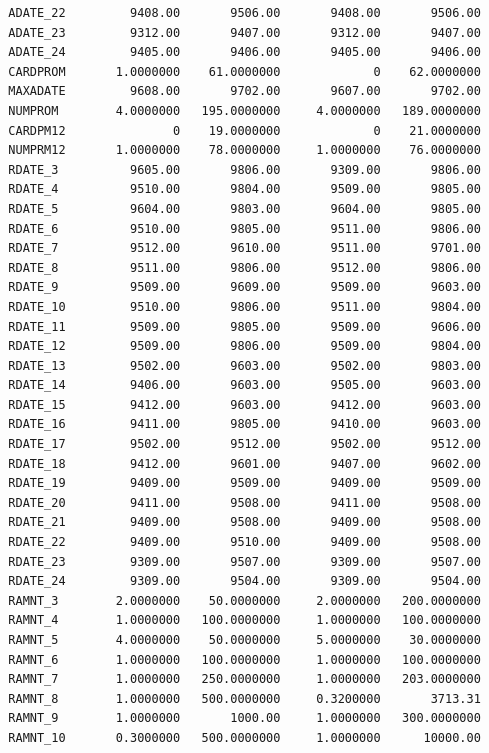 \documentclass[
  11pt,
  a4paper,
  DIV=12,captions=tableheading,oneside,titlepage]{scrbook}
\begin{document}
\begin{verbatim}
  ADATE_22         9408.00       9506.00       9408.00       9506.00 
  ADATE_23         9312.00       9407.00       9312.00       9407.00 
  ADATE_24         9405.00       9406.00       9405.00       9406.00 
  CARDPROM       1.0000000    61.0000000             0    62.0000000 
  MAXADATE         9608.00       9702.00       9607.00       9702.00 
  NUMPROM        4.0000000   195.0000000     4.0000000   189.0000000 
  CARDPM12               0    19.0000000             0    21.0000000 
  NUMPRM12       1.0000000    78.0000000     1.0000000    76.0000000 
  RDATE_3          9605.00       9806.00       9309.00       9806.00 
  RDATE_4          9510.00       9804.00       9509.00       9805.00 
  RDATE_5          9604.00       9803.00       9604.00       9805.00 
  RDATE_6          9510.00       9805.00       9511.00       9806.00 
  RDATE_7          9512.00       9610.00       9511.00       9701.00 
  RDATE_8          9511.00       9806.00       9512.00       9806.00 
  RDATE_9          9509.00       9609.00       9509.00       9603.00 
  RDATE_10         9510.00       9806.00       9511.00       9804.00 
  RDATE_11         9509.00       9805.00       9509.00       9606.00 
  RDATE_12         9509.00       9806.00       9509.00       9804.00 
  RDATE_13         9502.00       9603.00       9502.00       9803.00 
  RDATE_14         9406.00       9603.00       9505.00       9603.00 
  RDATE_15         9412.00       9603.00       9412.00       9603.00 
  RDATE_16         9411.00       9805.00       9410.00       9603.00 
  RDATE_17         9502.00       9512.00       9502.00       9512.00 
  RDATE_18         9412.00       9601.00       9407.00       9602.00 
  RDATE_19         9409.00       9509.00       9409.00       9509.00 
  RDATE_20         9411.00       9508.00       9411.00       9508.00 
  RDATE_21         9409.00       9508.00       9409.00       9508.00 
  RDATE_22         9409.00       9510.00       9409.00       9508.00 
  RDATE_23         9309.00       9507.00       9309.00       9507.00 
  RDATE_24         9309.00       9504.00       9309.00       9504.00 
  RAMNT_3        2.0000000    50.0000000     2.0000000   200.0000000 
  RAMNT_4        1.0000000   100.0000000     1.0000000   100.0000000 
  RAMNT_5        4.0000000    50.0000000     5.0000000    30.0000000 
  RAMNT_6        1.0000000   100.0000000     1.0000000   100.0000000 
  RAMNT_7        1.0000000   250.0000000     1.0000000   203.0000000 
  RAMNT_8        1.0000000   500.0000000     0.3200000       3713.31 
  RAMNT_9        1.0000000       1000.00     1.0000000   300.0000000 
  RAMNT_10       0.3000000   500.0000000     1.0000000      10000.00 

\end{verbatim}
\end{document}

